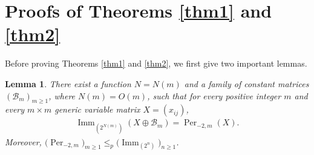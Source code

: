 \documentclass[11pt,a4paper]{article}
\newtheorem{lemma}[theorem]{Lemma}
\begin{document}
\section{Proofs of Theorems \ref{thm1} and \ref{thm2}}

Before proving Theorems \ref{thm1} and \ref{thm2}, we first give two important lemmas.

\begin{lemma}\label{lem2.10}
There exist a function $N=N(m)$ and a family of constant matrices $(\mathcal B_m)_{m\geq1}$, where $N(m)=O(m)$, such that for every positive integer $m$ and every $m\times m$ generic variable matrix $X=(x_{ij})$,
\begin{eqnarray*}
  \operatorname{Imm}_{(2^{N(m)})}(X\oplus\mathcal B_m)
  =\operatorname{Per}_{-2,m}(X).
\end{eqnarray*}
Moreover, $\bigl(\operatorname{Per}_{-2,m}\bigr)_{m\geq1}\leq_p
\bigl(\operatorname{Imm}_{(2^n)}\bigr)_{n\geq1}$.
\end{lemma}
\end{document}
